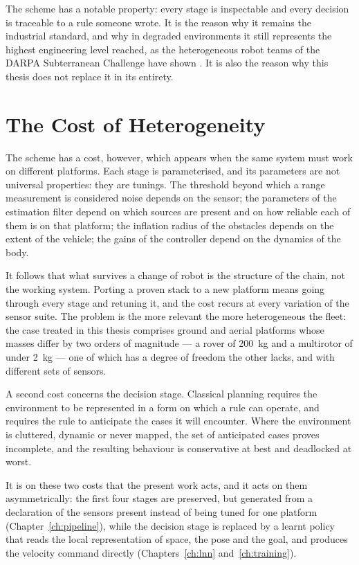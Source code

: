\medskip

The scheme has a notable property: every stage is inspectable and every decision
is traceable to a rule someone wrote. It is the reason why it remains the
industrial standard, and why in degraded environments it still represents the
highest engineering level reached, as the heterogeneous robot teams of the DARPA
Subterranean Challenge have shown \cite{tranzatto2022cerberus}. It is also the
reason why this thesis does not replace it in its entirety.

\section{The Cost of Heterogeneity}
\label{sec:bg-portability}

The scheme has a cost, however, which appears when the same system must work on
different platforms. Each stage is parameterised, and its parameters are not
universal properties: they are tunings. The threshold beyond which a range
measurement is considered noise depends on the sensor; the parameters of the
estimation filter depend on which sources are present and on how reliable each
of them is on that platform; the inflation radius of the obstacles depends on
the extent of the vehicle; the gains of the controller depend on the dynamics of
the body.

It follows that what survives a change of robot is the structure of the chain,
not the working system. Porting a proven stack to a new platform means going
through every stage and retuning it, and the cost recurs at every variation of
the sensor suite. The problem is the more relevant the more heterogeneous the
fleet: the case treated in this thesis comprises ground and aerial platforms
whose masses differ by two orders of magnitude --- a rover of \SI{200}{\kilo\gram}
and a multirotor of under \SI{2}{\kilo\gram} --- one of which has a degree of
freedom the other lacks, and with different sets of sensors.

A second cost concerns the decision stage. Classical planning requires the
environment to be represented in a form on which a rule can operate, and
requires the rule to anticipate the cases it will encounter. Where the
environment is cluttered, dynamic or never mapped, the set of anticipated cases
proves incomplete, and the resulting behaviour is conservative at best and
deadlocked at worst.

It is on these two costs that the present work acts, and it acts on them
asymmetrically: the first four stages are preserved, but generated from a
declaration of the sensors present instead of being tuned for one platform
(Chapter~\ref{ch:pipeline}), while the decision stage is replaced by a learnt
policy that reads the local representation of space, the pose and the goal, and
produces the velocity command directly (Chapters~\ref{ch:lnn}
and~\ref{ch:training}).

